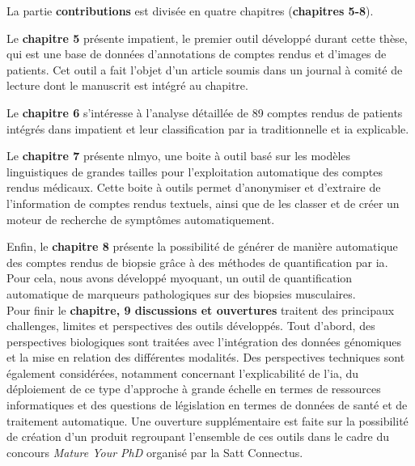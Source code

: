 La partie \textbf{contributions} est divisée en quatre chapitres (\textbf{chapitres 5-8}). 

Le \textbf{chapitre 5 }présente \gls{impatient}, le premier outil développé durant cette thèse, qui est une base de données d'annotations de comptes rendus et d'images de patients. Cet outil a fait l'objet d'un article soumis dans un journal à comité de lecture dont le manuscrit est intégré au chapitre. 

Le \textbf{chapitre 6} s'intéresse à l'analyse détaillée de 89 comptes rendus de patients intégrés dans \gls{impatient} et leur classification par \gls{ia} traditionnelle et \gls{ia} explicable.

Le \textbf{chapitre 7} présente \gls{nlmyo}, une boite à outil basé sur les modèles linguistiques de grandes tailles pour l'exploitation automatique des comptes rendus médicaux. Cette boite à outils permet d'anonymiser et d'extraire de l'information de comptes rendus textuels, ainsi que de les classer et de créer un moteur de recherche de symptômes automatiquement. 

Enfin, le \textbf{chapitre 8 }présente la possibilité de générer de manière automatique des comptes rendus de biopsie grâce à des méthodes de quantification par \gls{ia}. Pour cela, nous avons développé \gls{myoquant}, un outil de quantification automatique de marqueurs pathologiques sur des biopsies musculaires. \\


Pour finir le \textbf{chapitre, 9 discussions et ouvertures} traitent des principaux challenges, limites et perspectives des outils développés. Tout d'abord, des perspectives biologiques sont traitées avec l'intégration des données génomiques et la mise en relation des différentes modalités. Des perspectives techniques sont également considérées, notamment concernant l'explicabilité de l'\gls{ia}, du déploiement de ce type d'approche à grande échelle en termes de ressources informatiques et des questions de législation en termes de données de santé et de traitement automatique. Une ouverture supplémentaire est faite sur la possibilité de création d'un produit regroupant l'ensemble de ces outils dans le cadre du concours \textit{Mature Your PhD} organisé par la Satt Connectus.